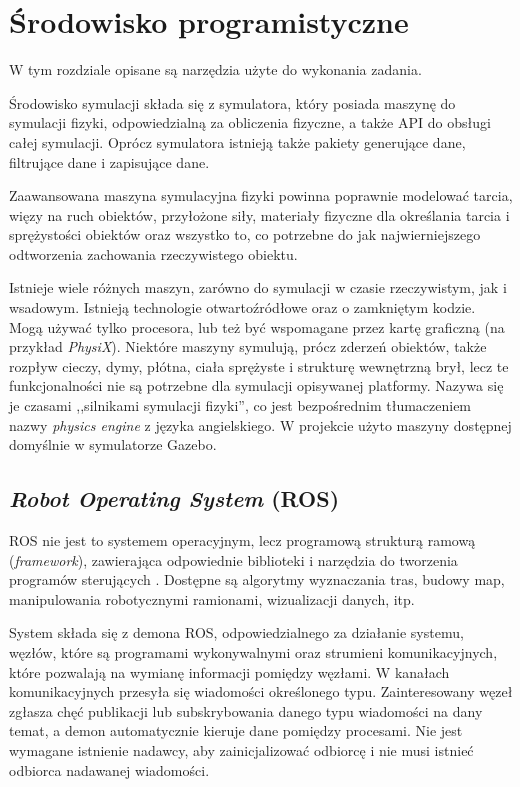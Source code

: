 \chapter{Środowisko programistyczne} 
\label{sec:tools}
W tym rozdziale opisane są narzędzia użyte do wykonania zadania.

Środowisko symulacji składa się z symulatora, który posiada maszynę do symulacji fizyki, odpowiedzialną za obliczenia fizyczne, a także API do obsługi całej symulacji.
Oprócz symulatora istnieją także pakiety generujące dane, filtrujące dane i zapisujące dane.

Zaawansowana maszyna symulacyjna fizyki powinna poprawnie modelować tarcia, więzy na ruch obiektów, przyłożone siły, materiały fizyczne dla określania tarcia i sprężystości obiektów
oraz wszystko to, co potrzebne do jak najwierniejszego odtworzenia zachowania rzeczywistego obiektu.

Istnieje wiele różnych maszyn, zarówno do symulacji w czasie rzeczywistym, jak i wsadowym.
Istnieją technologie otwartoźródłowe oraz o zamkniętym kodzie. 
Mogą używać tylko procesora, lub też być wspomagane przez kartę graficzną (na przykład \emph{PhysiX}).
Niektóre maszyny symulują, prócz zderzeń obiektów, także rozpływ cieczy, dymy, płótna, ciała sprężyste i strukturę wewnętrzną brył, 
lecz te funkcjonalności nie są potrzebne dla symulacji opisywanej platformy. Nazywa się je czasami ,,silnikami symulacji fizyki'', co jest bezpośrednim tłumaczeniem nazwy
\emph{physics engine} z języka angielskiego. W projekcie użyto maszyny dostępnej domyślnie w symulatorze Gazebo.

\section{\emph{Robot Operating System} (ROS)}
	ROS nie jest to systemem operacyjnym, lecz programową strukturą ramową (\emph{framework}), zawierająca odpowiednie biblioteki i narzędzia do tworzenia programów sterujących \cite{ros_website}.
	Dostępne są algorytmy wyznaczania tras, budowy map, manipulowania robotycznymi ramionami, wizualizacji danych, itp. 

	System składa się z demona ROS, odpowiedzialnego za działanie systemu, węzłów, które są programami wykonywalnymi oraz strumieni komunikacyjnych, które 
	pozwalają na wymianę informacji pomiędzy węzłami.
	W kanałach komunikacyjnych przesyła się wiadomości określonego typu.
	Zainteresowany węzeł zgłasza chęć publikacji lub subskrybowania danego typu wiadomości na dany temat, a demon automatycznie kieruje dane pomiędzy procesami.
	Nie jest wymagane istnienie nadawcy, aby zainicjalizować odbiorcę i nie musi istnieć odbiorca nadawanej wiadomości.

